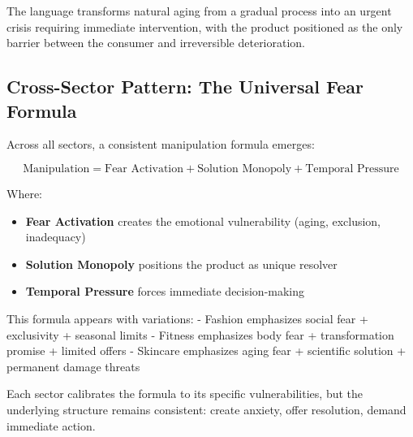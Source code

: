 The language transforms natural aging from a gradual process into an urgent crisis requiring immediate intervention, with the product positioned as the only barrier between the consumer and irreversible deterioration.

\subsection{Cross-Sector Pattern: The Universal Fear Formula}

Across all sectors, a consistent manipulation formula emerges:

\begin{equation}
\text{Manipulation} = \text{Fear Activation} + \text{Solution Monopoly} + \text{Temporal Pressure}
\end{equation}

Where:
\begin{itemize}
\item \textbf{Fear Activation} creates the emotional vulnerability (aging, exclusion, inadequacy)
\item \textbf{Solution Monopoly} positions the product as unique resolver
\item \textbf{Temporal Pressure} forces immediate decision-making
\end{itemize}

This formula appears with variations:
- Fashion emphasizes social fear + exclusivity + seasonal limits
- Fitness emphasizes body fear + transformation promise + limited offers  
- Skincare emphasizes aging fear + scientific solution + permanent damage threats

Each sector calibrates the formula to its specific vulnerabilities, but the underlying structure remains consistent: create anxiety, offer resolution, demand immediate action.